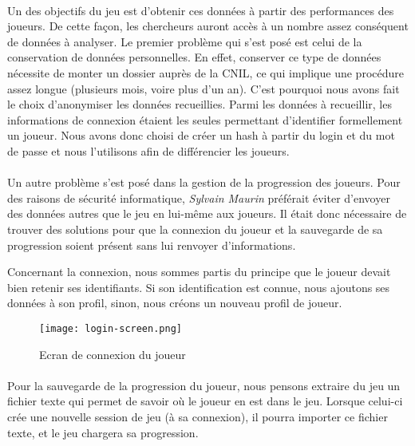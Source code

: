 \paragraph{}Un des objectifs du jeu est d'obtenir ces données à partir des performances des joueurs. De cette façon, les chercheurs auront accès à un nombre assez conséquent de
données à analyser. Le premier problème qui s'est posé est celui de la conservation de données personnelles. En effet, conserver ce type de données nécessite de monter un dossier
auprès de la \gls{CNIL}, ce qui implique une procédure assez longue (plusieurs mois, voire plus d'un an). C'est pourquoi nous avons fait le choix d'anonymiser les données recueillies.
Parmi les données à recueillir, les informations de connexion étaient les seules permettant d'identifier formellement un joueur. Nous avons donc choisi de créer un hash à partir du
login et du mot de passe et nous l'utilisons afin de différencier les joueurs.

\paragraph{}Un autre problème s'est posé dans la gestion de la progression des joueurs. Pour des raisons de sécurité informatique, \emph{Sylvain Maurin} préférait éviter d'envoyer des
données autres que le jeu en lui-même aux joueurs. Il était donc nécessaire de trouver des solutions pour que la connexion du joueur et la sauvegarde de sa progression soient présent
sans lui renvoyer d'informations.

Concernant la connexion, nous sommes partis du principe que le joueur devait bien retenir ses identifiants. Si son identification est connue, nous ajoutons ses données à son profil,
sinon, nous créons un nouveau profil de joueur.

\begin{figure}[H]
    \begin{center}
    \texttt{[image: login-screen.png]}
    \end{center}
    \caption{Ecran de connexion du joueur}
\label{LoginScreen}
\end{figure}

\paragraph{}Pour la sauvegarde de la progression du joueur, nous pensons extraire du jeu un fichier texte qui permet de savoir où le joueur en est dans le jeu. Lorsque celui-ci crée une
nouvelle session de jeu (à sa connexion), il pourra importer ce fichier texte, et le jeu chargera sa progression.

